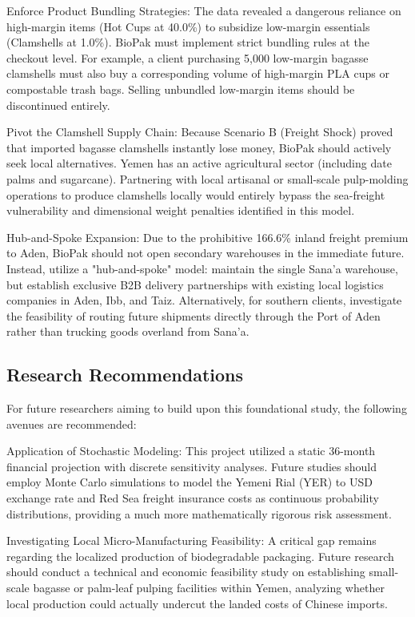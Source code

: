 \documentclass[12pt,a4paper]{article}
\begin{document}
Enforce Product Bundling Strategies: The data revealed a dangerous reliance on high-margin items (Hot Cups at 40.0\%) to subsidize low-margin essentials (Clamshells at 1.0\%). BioPak must implement strict bundling rules at the checkout level. For example, a client purchasing 5,000 low-margin bagasse clamshells must also buy a corresponding volume of high-margin PLA cups or compostable trash bags. Selling unbundled low-margin items should be discontinued entirely.

Pivot the Clamshell Supply Chain: Because Scenario B (Freight Shock) proved that imported bagasse clamshells instantly lose money, BioPak should actively seek local alternatives. Yemen has an active agricultural sector (including date palms and sugarcane). Partnering with local artisanal or small-scale pulp-molding operations to produce clamshells locally would entirely bypass the sea-freight vulnerability and dimensional weight penalties identified in this model.

Hub-and-Spoke Expansion: Due to the prohibitive 166.6\% inland freight premium to Aden, BioPak should not open secondary warehouses in the immediate future. Instead, utilize a "hub-and-spoke" model: maintain the single Sana'a warehouse, but establish exclusive B2B delivery partnerships with existing local logistics companies in Aden, Ibb, and Taiz. Alternatively, for southern clients, investigate the feasibility of routing future shipments directly through the Port of Aden rather than trucking goods overland from Sana'a.

\subsection{Research Recommendations}

For future researchers aiming to build upon this foundational study, the following avenues are recommended:

Application of Stochastic Modeling: This project utilized a static 36-month financial projection with discrete sensitivity analyses. Future studies should employ Monte Carlo simulations to model the Yemeni Rial (YER) to USD exchange rate and Red Sea freight insurance costs as continuous probability distributions, providing a much more mathematically rigorous risk assessment.

Investigating Local Micro-Manufacturing Feasibility: A critical gap remains regarding the localized production of biodegradable packaging. Future research should conduct a technical and economic feasibility study on establishing small-scale bagasse or palm-leaf pulping facilities within Yemen, analyzing whether local production could actually undercut the landed costs of Chinese imports.
\end{document}
